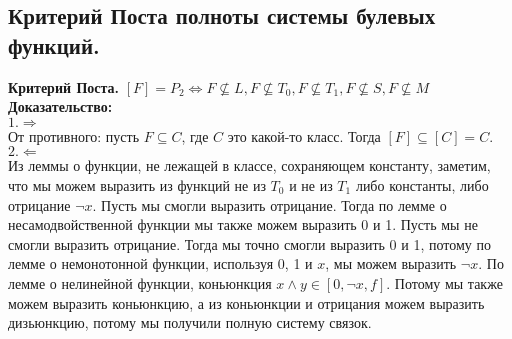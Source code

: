 \subsection{Критерий Поста полноты системы булевых функций.}
\textbf{Критерий Поста.} $[F] = P_2 \Leftrightarrow F \nsubseteq L, F \nsubseteq T_0, F \nsubseteq T_1, F \nsubseteq S, F \nsubseteq M$\\

\noindent \textbf{Доказательство:}\\

$1. \Rightarrow$\\

От противного: пусть $F \subseteq C$, где $C$ это какой-то класс. Тогда $[F] \subseteq [C] = C$.\\

$2. \Leftarrow$\\

Из леммы о функции, не лежащей в классе, сохраняющем константу, заметим, что мы можем выразить из функций не из $T_0$ и не из $T_1$ либо константы, либо отрицание $\neg x$. Пусть мы смогли выразить отрицание. Тогда по лемме о несамодвойственной функции мы также можем выразить 0 и 1. Пусть мы не смогли выразить отрицание. Тогда мы точно смогли выразить 0 и 1, потому по лемме о немонотонной функции, используя 0, 1 и $x$, мы можем выразить $\neg x$.
По лемме о нелинейной функции, коньюнкция $x \wedge y \in [0, \neg x, f]$. Потому мы также можем выразить коньюнкцию, а из коньюнкции и отрицания можем выразить дизьюнкцию, потому мы получили полную систему связок.

